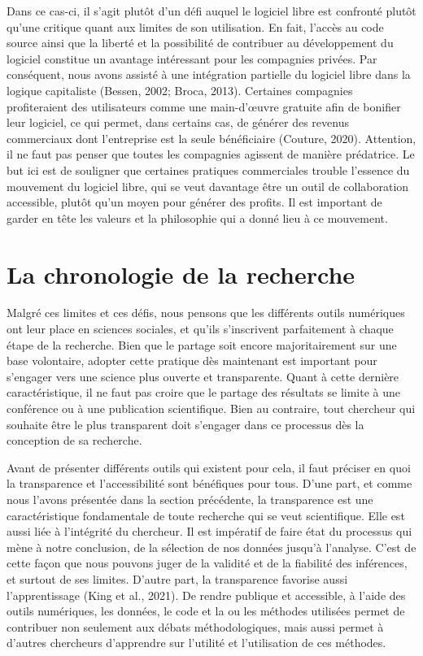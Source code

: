 \documentclass[
  letterpaper,
  DIV=11,
  numbers=noendperiod]{scrreprt}
\begin{document}
Dans ce cas-ci, il s'agit plutôt d'un défi auquel le logiciel libre est
confronté plutôt qu'une critique quant aux limites de son utilisation.
En fait, l'accès au code source ainsi que la liberté et la possibilité
de contribuer au développement du logiciel constitue un avantage
intéressant pour les compagnies privées. Par conséquent, nous avons
assisté à une intégration partielle du logiciel libre dans la logique
capitaliste (Bessen, 2002; Broca, 2013). Certaines compagnies
profiteraient des utilisateurs comme une main-d'œuvre gratuite afin de
bonifier leur logiciel, ce qui permet, dans certains cas, de générer des
revenus commerciaux dont l'entreprise est la seule bénéficiaire
(Couture, 2020). Attention, il ne faut pas penser que toutes les
compagnies agissent de manière prédatrice. Le but ici est de souligner
que certaines pratiques commerciales trouble l'essence du mouvement du
logiciel libre, qui se veut davantage être un outil de collaboration
accessible, plutôt qu'un moyen pour générer des profits. Il est
important de garder en tête les valeurs et la philosophie qui a donné
lieu à ce mouvement.

\section{La chronologie de la
recherche}\label{la-chronologie-de-la-recherche}

Malgré ces limites et ces défis, nous pensons que les différents outils
numériques ont leur place en sciences sociales, et qu'ils s'inscrivent
parfaitement à chaque étape de la recherche. Bien que le partage soit
encore majoritairement sur une base volontaire, adopter cette pratique
dès maintenant est important pour s'engager vers une science plus
ouverte et transparente. Quant à cette dernière caractéristique, il ne
faut pas croire que le partage des résultats se limite à une conférence
ou à une publication scientifique. Bien au contraire, tout chercheur qui
souhaite être le plus transparent doit s'engager dans ce processus dès
la conception de sa recherche.

Avant de présenter différents outils qui existent pour cela, il faut
préciser en quoi la transparence et l'accessibilité sont bénéfiques pour
tous. D'une part, et comme nous l'avons présentée dans la section
précédente, la transparence est une caractéristique fondamentale de
toute recherche qui se veut scientifique. Elle est aussi liée à
l'intégrité du chercheur. Il est impératif de faire état du processus
qui mène à notre conclusion, de la sélection de nos données jusqu'à
l'analyse. C'est de cette façon que nous pouvons juger de la validité et
de la fiabilité des inférences, et surtout de ses limites. D'autre part,
la transparence favorise aussi l'apprentissage (King et al., 2021). De
rendre publique et accessible, à l'aide des outils numériques, les
données, le code et la ou les méthodes utilisées permet de contribuer
non seulement aux débats méthodologiques, mais aussi permet à d'autres
chercheurs d'apprendre sur l'utilité et l'utilisation de ces méthodes.
\end{document}
